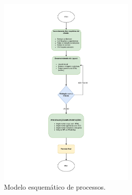 \begin{figure}[H]
    \centering
    \includegraphics[width=0.6\textwidth]{Figures/modelo_esquematico_de_processos..pdf} %
    \caption{Modelo esquemático de processos.}
    \label{fig:esquema}
\end{figure}




